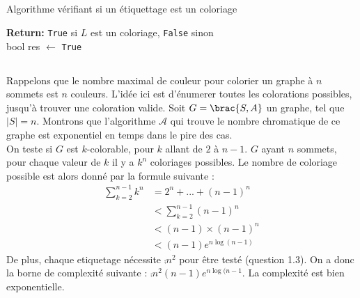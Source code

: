 \subsection{}

\begin{algorithm}

\caption{Algorithme vérifiant si un étiquettage est un coloriage}
\label{alg:two}

\textbf{Return:} \texttt{True} si $L$ est un coloriage, \texttt{False} sinon\\

bool res $\gets$ \texttt{True}\;



\end{algorithm}




\subsection{}

Rappelons que le nombre maximal de couleur pour colorier un graphe à $n$ sommets est $n$ couleurs.
L'idée ici est d'énumerer toutes les colorations possibles, jusqu'à trouver une coloration valide. Soit $G = \brac{S,A}$ un graphe, tel que $\lvert S \rvert = n$. Montrons que l'algorithme $\mathcal{A}$ qui trouve le nombre chromatique de ce graphe est exponentiel en temps dans le pire des cas.
\\
On teste si $G$ est $k$-colorable, pour $k$ allant de $2$ à $n-1$. $G$ ayant $n$ sommets, pour chaque valeur de $k$ il y a $k^n$ coloriages possibles.
Le nombre de coloriage possible est alors donné par la formule suivante : 
\begin{align}
    \sum^{n-1}_{k = 2} k^n &= 2^n + ... + (n-1)^n\\
    &< \sum_{k=2}^{n-1} (n-1)^n \\
    &< (n-1)\times (n-1)^n\\
    &< (n-1) e^{n \log (n-1)}
\end{align}
De plus, chaque etiquetage nécessite $\comp{n^2}$ pour être testé (question 1.3). On a donc la borne de complexité suivante : 
$\comp{n^2(n-1) e^{n \log(n-1}}$. La complexité est bien exponentielle.